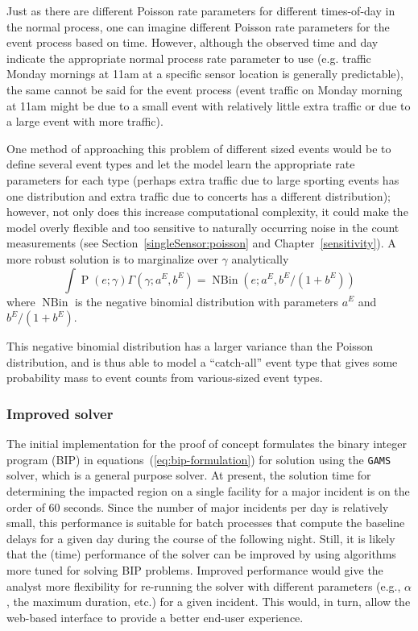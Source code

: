 \documentclass[12pt]{report}
\DeclareMathOperator{\poisson}{P} %
\DeclareMathOperator{\nbin}{NBin} %
\newcounter{time}
\begin{document}
Just as there are different Poisson rate parameters for different
times-of-day in the normal process, one can imagine different Poisson
rate parameters for the event process based on time.  However,
although the observed time and day indicate the appropriate normal
process rate parameter to use (e.g. traffic Monday mornings at 11am at
a specific sensor location is generally predictable), the same cannot
be said for the event process (event traffic on Monday morning at 11am
might be due to a small event with relatively little extra traffic or
due to a large event with more traffic).

One method of approaching this problem of different sized events would
be to define several event types and let the model learn the
appropriate rate parameters for each type (perhaps extra traffic due
to large sporting events has one distribution and extra traffic due to
concerts has a different distribution); however, not only does this
increase computational complexity, it could make the model overly
flexible and too sensitive to naturally occurring noise in the count
measurements (see Section~\ref{singleSensor:poisson} and
Chapter~\ref{sensitivity}).  A more robust solution is to marginalize
over $\gamma$ analytically
\begin{equation}\label{eq:nbin}
  \int \poisson(e; \gamma) \Gamma(\gamma; a^E,b^E) = \nbin(e; a^E, b^E/(1+b^E))
\end{equation}
where $\nbin$ is the negative binomial distribution with parameters
$a^E$ and $b^E/(1+b^E)$.

This negative binomial distribution has a larger variance than the
Poisson distribution, and is thus able to model a ``catch-all'' event
type that gives some probability mass to event counts from
various-sized event types.


\subsubsection{Improved solver}
\label{sec:improved-solver}


The initial implementation for the proof of concept formulates the
binary integer program (BIP) in equations~(\ref{eq:bip-formulation})
for solution using the \texttt{GAMS} solver, which is a general
purpose solver.  At present, the solution time for determining the
impacted region on a single facility for a major incident is on the
order of 60 seconds.  Since the number of major incidents per day is
relatively small, this performance is suitable for batch processes
that compute the baseline delays for a given day during the course of
the following night.  Still, it is likely that the (time) performance
of the solver can be improved by using algorithms more tuned for
solving BIP problems.  Improved performance would give the analyst
more flexibility for re-running the solver with different parameters
(e.g., $\alpha$, the maximum duration, etc.) for a given incident.
This would, in turn, allow the web-based interface to provide a better
end-user experience.
\end{document}
